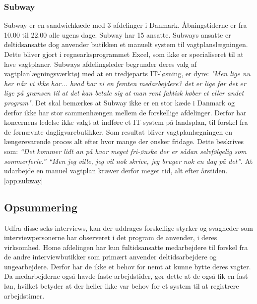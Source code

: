 \subsubsection{Subway}
Subway er en sandwichkæde med 3 afdelinger i Danmark. Åbningstiderne er fra 10.00 til 22.00 alle ugens dage. Subway har 15 ansatte. Subways ansatte er deltidsansatte dog anvender butikken et manuelt system til vagtplanslægningen. Dette bliver gjort i regnearksprogrammet Excel, som ikke er specialiseret til at lave vagtplaner. Subways afdelingsleder begrunder deres valg af vagtplanlægningsværktøj med at en tredjeparts IT-løsning, er dyre: \textit{"Men lige nu her når vi ikke har... hvad har vi en femten medarbejdere? det er lige før det er lige på grænsen til at det kan betale sig at man rent faktisk køber et eller andet program"}.
Det skal bemærkes at Subway ikke er en stor kæde i Danmark og derfor ikke har stor sammenhængen mellem de forskellige afdelinger. Derfor har koncernens ledelse ikke valgt at indføre et IT-system på landsplan, til forskel fra de førnævnte dagligvarebutikker. Som resultat bliver vagtplanlægningen en længerevarende proces alt efter hvor mange der ønsker fridage. Dette beskrives som: \textit{“Det kommer lidt an på hvor meget fri-ønske der er sådan selvfølgelig som sommerferie.” “Men jeg ville, jeg vil nok skrive, jeg bruger nok en dag på det”}. At udarbejde en manuel vagtplan kræver derfor meget tid, alt efter årstiden. \ref{app:subway}

\subsection{Opsummering}
Udfra disse seks interviews, kan der uddrages forskellige styrker og svagheder som interviewpersonerne har observeret i det program de anvender, i deres virksomhed. Home afdelingen har kun fultidsansatte medarbejdere til forskel fra de andre interviewbutikker som primært anvender deltidsarbejdere og ungearbejdere. Derfor har de ikke et behov for nemt at kunne bytte deres vagter. Da medarbejderne også havde faste arbejdstider, gør dette at de også fik en fast løn, hvilket betyder at der heller ikke var behov for et system til at registrere arbejdstimer.

